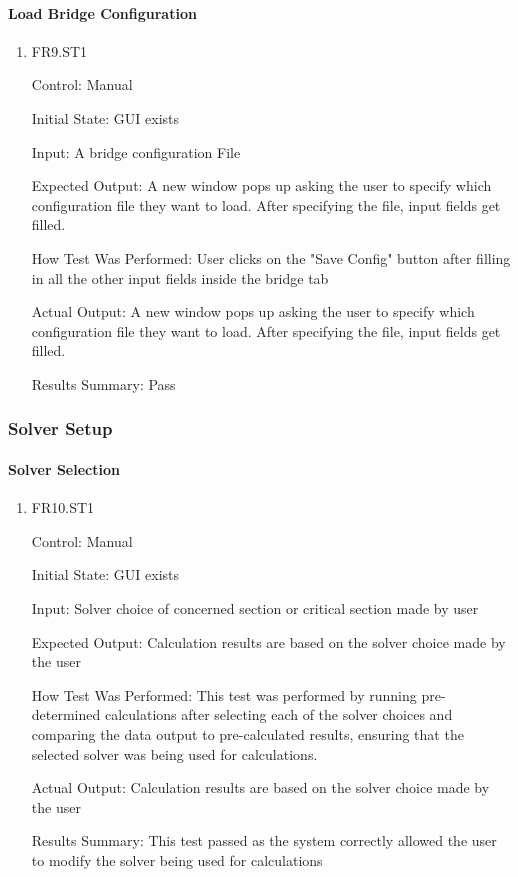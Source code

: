 \documentclass[12pt, titlepage]{article}
\begin{document}
\paragraph{Load Bridge Configuration}

\begin{enumerate}
  
  \item{FR9.ST1\\}
  
  Control: Manual
  
  Initial State: GUI exists
  
  Input: A bridge configuration File
  
  Expected Output: A new window pops up asking the user to specify which configuration file they want to load. After specifying the file, input fields get filled. 
  
  How Test Was Performed: User clicks on the "Save Config" button after filling in all the other input fields inside the bridge tab

  Actual Output: A new window pops up asking the user to specify which configuration file they want to load. After specifying the file, input fields get filled.
    
  Results Summary: Pass  

\end{enumerate}

\subsubsection{Solver Setup}

\paragraph{Solver Selection}

\begin{enumerate}

  \item{FR10.ST1\\}

  Control: Manual
            
  Initial State: GUI exists
            
  Input: Solver choice of concerned section or critical section made by user
            
  Expected Output: Calculation results are based on the solver choice made by the user
         
  How Test Was Performed: This test was performed by running pre-determined calculations after selecting each of the solver choices and comparing the data output to pre-calculated results, ensuring that the selected solver was being used for calculations. 
	
  Actual Output: Calculation results are based on the solver choice made by the user

  Results Summary: This test passed as the system correctly allowed the user to modify the solver being used for calculations
				
\end{enumerate}
\end{document}
